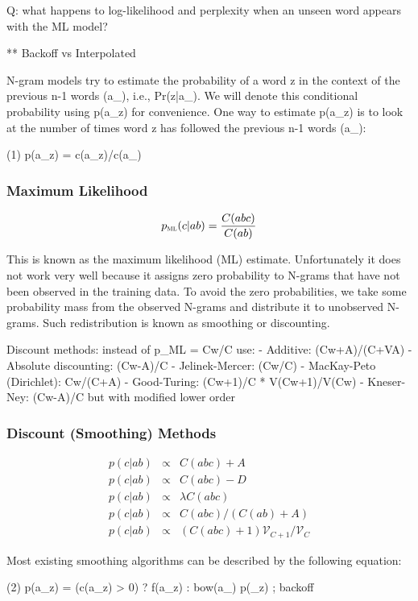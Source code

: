 \documentclass[ignorenonframetext]{beamer}
\newcommand{\vocab}{\mathcal{V}}
\newcommand{\pml}{p_{\textsc{ml}}}
\begin{document}
Q: what happens to log-likelihood and perplexity when an unseen word
appears with the ML model?


** Backoff vs Interpolated

       N-gram models try to estimate the probability of a word z in the context of the  previous  n-1  words
       (a_), i.e., Pr(z|a_).  We will denote this conditional probability using p(a_z) for convenience.  One
       way to estimate p(a_z) is to look at the number of times word z has followed the previous  n-1  words
       (a_):

       (1)  p(a_z) = c(a_z)/c(a_)

\begin{frame}\frametitle{Maximum Likelihood}
\begin{equation}
\pml(c|ab) = \frac{C(abc)}{C(ab)}
\end{equation}
\end{frame}

       This  is  known  as  the  maximum likelihood (ML) estimate.  Unfortunately it does not work very well
       because it assigns zero probability to N-grams that have not been observed in the training data.   To
       avoid  the zero probabilities, we take some probability mass from the observed N-grams and distribute
       it to unobserved N-grams.  Such redistribution is known as smoothing or discounting.


Discount methods: instead of p_ML = Cw/C use:
- Additive: (Cw+A)/(C+VA)
- Absolute discounting: (Cw-A)/C
- Jelinek-Mercer: \lambda * (Cw/C)
- MacKay-Peto (Dirichlet): Cw/(C+A)
- Good-Turing: (Cw+1)/C * V(Cw+1)/V(Cw)
- Kneser-Ney: (Cw-A)/C but with modified lower order

\begin{frame}\frametitle{Discount (Smoothing) Methods}
\begin{eqnarray*}
p(c|ab) & \propto & C(abc) + A \\
p(c|ab) & \propto & C(abc) - D \\
p(c|ab) & \propto & \lambda C(abc) \\
p(c|ab) & \propto & C(abc) / (C(ab) + A) \\
p(c|ab) & \propto & (C(abc)+1)\vocab_{C+1}/\vocab_{C}
\end{eqnarray*}
\end{frame}

       Most existing smoothing algorithms can be described by the following equation:

       (2)  p(a_z) = (c(a_z) > 0) ? f(a_z) : bow(a_) p(_z)   ; backoff
\end{document}
